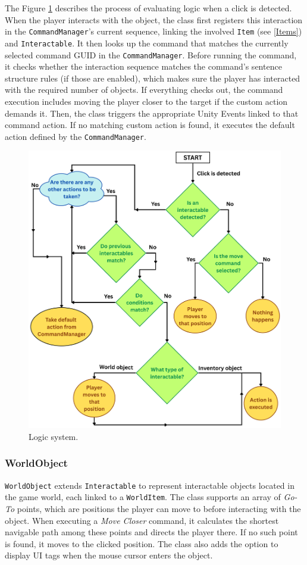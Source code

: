 The Figure \ref{fig:Interactable} describes the process of evaluating logic when a click is detected. When the player interacts with the object, the class first registers this interaction in the \verb|CommandManager|’s current sequence, linking the involved \verb|Item| (see \ref{Items}) and \verb|Interactable|. It then looks up the command that matches the currently selected command GUID in the \verb|CommandManager|. Before running the command, it checks whether the interaction sequence matches the command’s sentence structure rules (if those are enabled), which makes sure the player has interacted with the required number of objects. If everything checks out, the command execution includes moving the player closer to the target if the custom action demands it. Then, the class triggers the appropriate Unity Events linked to that command action. If no matching custom action is found, it executes the default action defined by the \verb|CommandManager|.

\begin{figure}[H]
\centering
\includegraphics[width=0.9\linewidth]{img/Commands3.png}
\caption{Logic system.}
\label{fig:Interactable}
\end{figure}

\subsubsection{WorldObject}
\verb|WorldObject| extends \verb|Interactable| to represent interactable objects located in the game world, each linked to a \verb|WorldItem|. The class supports an array of \textit{Go-To} points, which are positions the player can move to before interacting with the object. When executing a \textit{Move Closer} command, it calculates the shortest navigable path among these points and directs the player there. If no such point is found, it moves to the clicked position. The class also adds the option to display UI tags when the mouse cursor enters the object.

